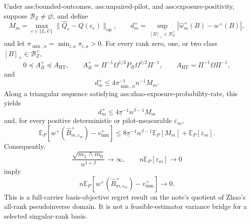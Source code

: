 Under ass:bounded-outcomes, ass:unpaired-pilot, and ass:exposure-positivity, suppose \(\mathcal B_Z\ne\varnothing\), and define
\[
 M_m=\max_{e\in\{L,U\}}\lVert\widehat Q_e-Q(c_e)\rVert_{\mathrm{op}},
 \qquad
 d_m^+=\sup_{[B]_+\in\mathcal B_Z^+}
 |\widehat w_m^+(B)-w^+(B)|,
\]
and let \(\pi_{\min,n}=\min_{i,a}\pi_{i,a}>0\).  For every rank zero, one, or two class \([B]_+\in\mathcal B_Z^+\),
\[
 0\preceq A_B^+\preceq A_{\mathrm{HT}},
 \qquad
 A_B^+=\Pi^{-1}\Omega^{1/2}P_B\Omega^{1/2}\Pi^{-1},
 \qquad
 A_{\mathrm{HT}}=\Pi^{-1}\Omega\Pi^{-1},
\]
and
\[
 d_m^+\le 4\pi_{\min,n}^{-1}n^{-1}M_m.
\]
Along a triangular sequence satisfying ass:zhao-exposure-probability-rate, this yields
\[
 d_m^+\le4\underline\pi^{-1}n^{\beta-1}M_m
\tag{A}
\]
and, for every positive deterministic or pilot-measurable \(\varepsilon_m\),
\[
 \mathbb E_P\!\left[
 w^+(\widehat B_{m,\varepsilon_m}^+)-v_{\mathrm{mm}}^+
 \right]
 \le
 8\underline\pi^{-1}n^{\beta-1}\mathbb E_P[M_m]
 +\mathbb E_P[\varepsilon_m].
\tag{B}
\]
Consequently,
\[
 \frac{\sqrt{m_1\wedge m_0}}{n^{1+\beta}}\longrightarrow\infty,
 \qquad n\mathbb E_P[\varepsilon_m]\longrightarrow0
\]
imply
\[
 n\mathbb E_P\!\left[
 w^+(\widehat B_{m,\varepsilon_m}^+)-v_{\mathrm{mm}}^+
 \right]\longrightarrow0.
\]
This is a full-carrier basis-objective regret result on the note's quotient of Zhao's all-rank pseudoinverse domain.  It is not a feasible-estimator variance bridge for a selected singular-rank basis.